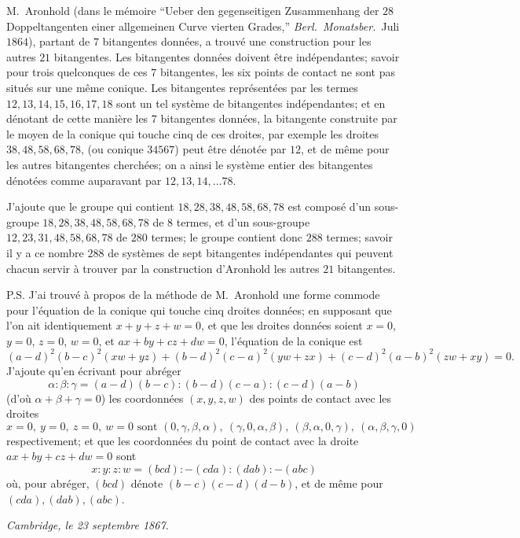 \documentclass[11pt,a4paper]{article}
\begin{document}
M.\ Aronhold (dans le m\'emoire ``Ueber den gegenseitigen Zusammenhang der $28$
Doppeltangenten einer allgemeinen Curve vierten Grades,'' \textit{Berl.\ Monatsber.}\ Juli
$1864$), partant de $7$ bitangentes donn\'ees, a trouv\'e une construction pour les
autres $21$ bitangentes. Les bitangentes donn\'ees doivent \^etre ind\'ependantes;
savoir pour trois quelconques de ces $7$ bitangentes, les six points de contact ne sont
pas situ\'es sur une m\^eme conique. Les bitangentes repr\'esent\'ees par les termes
$12, 13, 14, 15, 16, 17, 18$ sont un tel syst\`eme de bitangentes ind\'ependantes; et en
d\'enotant de cette mani\`ere les $7$ bitangentes donn\'ees, la bitangente construite par
le moyen de la conique qui touche cinq de ces droites, par exemple les droites
$38, 48, 58, 68, 78$, (ou conique $34567$) peut \^etre d\'enot\'ee par $12$, et de m\^eme
pour les autres bitangentes cherch\'ees; on a ainsi le syst\`eme entier des bitangentes
d\'enot\'ees comme auparavant par $12, 13, 14, \ldots 78$.

J'ajoute que le groupe qui contient $18, 28, 38, 48, 58, 68, 78$ est compos\'e d'un
sous-groupe $18, 28, 38, 48, 58, 68, 78$ de $8$ termes, et d'un sous-groupe
$12, 23, 31, 48, 58, 68, 78$ de $280$ termes; le groupe contient donc $288$ termes;
savoir il y a ce nombre $288$ de syst\`emes de sept bitangentes ind\'ependantes qui
peuvent chacun servir \`a trouver par la construction d'Aronhold les autres $21$ bitangentes.

\medskip

P.S. J'ai trouv\'e \`a propos de la m\'ethode de M.\ Aronhold une forme commode pour
l'\'equation de la conique qui touche cinq droites donn\'ees; en supposant que l'on ait
identiquement $x + y + z + w = 0$, et que les droites donn\'ees soient $x = 0$, $y = 0$,
$z = 0$, $w = 0$, et $ax + by + cz + dw = 0$, l'\'equation de la conique est
\[
(a - d)^2 (b - c)^2 (xw + yz) + (b - d)^2 (c - a)^2 (yw + zx) + (c - d)^2 (a - b)^2 (zw + xy) = 0.
\]
J'ajoute qu'en \'ecrivant pour abr\'eger
\[
\alpha : \beta : \gamma = (a - d)(b - c) : (b - d)(c - a) : (c - d)(a - b)
\]
(d'o\`u $\alpha + \beta + \gamma = 0$) les coordonn\'ees $(x, y, z, w)$ des points de
contact avec les droites
\[
x = 0,\ y = 0,\ z = 0,\ w = 0 \text{ sont } (0, \gamma, \beta, \alpha),\ (\gamma, 0, \alpha, \beta),\ (\beta, \alpha, 0, \gamma),\ (\alpha, \beta, \gamma, 0)
\]
respectivement; et que les coordonn\'ees du point de contact avec la droite
$ax + by + cz + dw = 0$ sont
\[
x : y : z : w = (bcd) : -(cda) : (dab) : -(abc)
\]
o\`u, pour abr\'eger, $(bcd)$ d\'enote $(b - c)(c - d)(d - b)$, et de m\^eme pour
$(cda), (dab), (abc)$.

\begin{flushright}
\textit{Cambridge, le 23 septembre 1867.}
\end{flushright}
\end{document}
